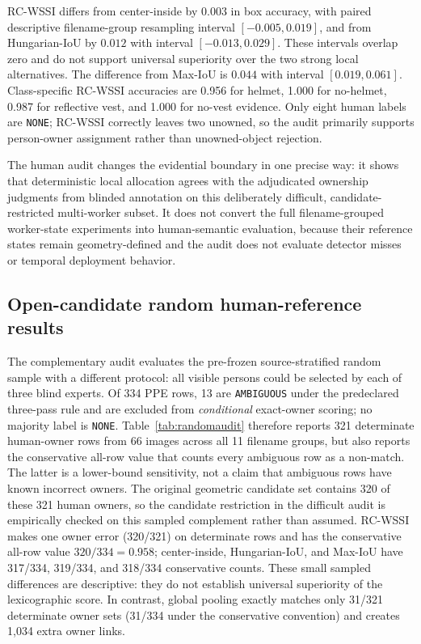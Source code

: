 \documentclass[iicol,pdflatex,sn-mathphys-num]{sn-jnl}
\begin{document}
RC-WSSI differs from center-inside by $0.003$ in box accuracy, with paired descriptive filename-group resampling interval $[-0.005,0.019]$, and from Hungarian-IoU by $0.012$ with interval $[-0.013,0.029]$. These intervals overlap zero and do not support universal superiority over the two strong local alternatives. The difference from Max-IoU is $0.044$ with interval $[0.019,0.061]$. Class-specific RC-WSSI accuracies are 0.956 for helmet, 1.000 for no-helmet, 0.987 for reflective vest, and 1.000 for no-vest evidence. Only eight human labels are \texttt{NONE}; RC-WSSI correctly leaves two unowned, so the audit primarily supports person-owner assignment rather than unowned-object rejection.

The human audit changes the evidential boundary in one precise way: it shows that deterministic local allocation agrees with the adjudicated ownership judgments from blinded annotation on this deliberately difficult, candidate-restricted multi-worker subset. It does not convert the full filename-grouped worker-state experiments into human-semantic evaluation, because their reference states remain geometry-defined and the audit does not evaluate detector misses or temporal deployment behavior.

\subsection{Open-candidate random human-reference results}

The complementary audit evaluates the pre-frozen source-stratified random sample with a different protocol: all visible persons could be selected by each of three blind experts. Of 334 PPE rows, 13 are \texttt{AMBIGUOUS} under the predeclared three-pass rule and are excluded from \emph{conditional} exact-owner scoring; no majority label is \texttt{NONE}. Table~\ref{tab:randomaudit} therefore reports 321 determinate human-owner rows from 66 images across all 11 filename groups, but also reports the conservative all-row value that counts every ambiguous row as a non-match. The latter is a lower-bound sensitivity, not a claim that ambiguous rows have known incorrect owners. The original geometric candidate set contains 320 of these 321 human owners, so the candidate restriction in the difficult audit is empirically checked on this sampled complement rather than assumed. RC-WSSI makes one owner error (320/321) on determinate rows and has the conservative all-row value $320/334=0.958$; center-inside, Hungarian-IoU, and Max-IoU have 317/334, 319/334, and 318/334 conservative counts. These small sampled differences are descriptive: they do not establish universal superiority of the lexicographic score. In contrast, global pooling exactly matches only 31/321 determinate owner sets (31/334 under the conservative convention) and creates 1,034 extra owner links.
\end{document}
